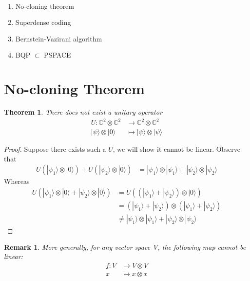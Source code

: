 \documentclass{article}
\newtheorem{thm}{Theorem}
\newtheorem*{remark}{Remark}
\newcommand{\ket}[1]{|#1\rangle}
\begin{document}
\noindent
{}

\vspace{.3cm}


\

\begin{enumerate}
\item No-cloning theorem
\item Superdense coding
\item Bernstein-Vazirani algorithm
\item BQP $\subset$ PSPACE
\end{enumerate}

\section{No-cloning Theorem}
\begin{thm}
There does not exist a unitary operator 
\begin{align*} 
U: \mathbb{C}^2 \otimes \mathbb{C}^2 & \longrightarrow\mathbb{C}^2 \otimes \mathbb{C}^2\\
\ket{\psi} \otimes \ket{0} &\longmapsto \ket{\psi} \otimes \ket{\psi}
\end{align*}
\end{thm}

\begin{proof}

Suppose there exists such a $U$, we will show it cannot be linear. Observe that
\begin{align*} 
U(\ket{\psi_1} \otimes \ket{0}) + U(\ket{\psi_2} \otimes \ket{0}) &= \ket{\psi_1} \otimes \ket{\psi_1} + \ket{\psi_2} \otimes \ket{\psi_2}
\end{align*}
Whereas
\begin{align*}
U(\ket{\psi_1} \otimes \ket{0} + \ket{\psi_2} \otimes \ket{0})&= U((\ket{\psi_1} + \ket{\psi_2}) \otimes \ket{0}) \\ 
&= (\ket{\psi_1}+\ket{\psi_2}) \otimes (\ket{\psi_1}+\ket{\psi_2}) \\
&\neq \ket{\psi_1} \otimes \ket{\psi_1} + \ket{\psi_2} \otimes \ket{\psi_2}
\end{align*}

\end{proof}
\begin{remark}
    More generally, for any vector space V, the following map cannot be linear:
\begin{align*} 
    f: V & \longrightarrow V \otimes V\\
    x &\longmapsto x \otimes x
\end{align*}
\end{remark}
\end{document}
